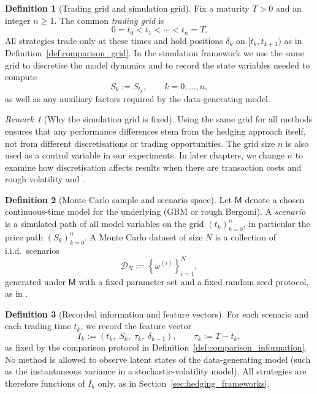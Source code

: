 \documentclass[12pt,a4paper]{article}
\theoremstyle{definition}
\newtheorem{definition}{Definition}[section]
\theoremstyle{plain}
\theoremstyle{remark}
\newtheorem{remark}{Remark}[section]
\theoremstyle{plain}
\begin{document}
\begin{definition}[Trading grid and simulation grid]
\label{def:sim_grid}
Fix a maturity $T>0$ and an integer $n\ge 1$. 
The common \emph{trading grid} is
\[
0=t_0<t_1<\cdots<t_n=T.
\]
All strategies trade only at these times and hold positions $\delta_k$ on $[t_k,t_{k+1})$ as in Definition~\ref{def:comparison_grid}. 
In the simulation framework we use the same grid to discretise the model dynamics and to record the state variables needed to compute
\[
S_k:=S_{t_k},\qquad k=0,\dots,n,
\]
as well as any auxiliary factors required by the data-generating model.
\end{definition}

\begin{remark}[Why the simulation grid is fixed]
\label{rem:fixed_grid}
Using the same grid for all methods ensures that any performance differences stem from the hedging approach itself, not from different discretisations or trading opportunities.
The grid size $n$ is also used as a control variable in our experiments. In later chapters, we change $n$ to examine how discretisation affects results when there are transaction costs and rough volatility \cite{Buehler2019DeepHedging} and \cite{Horvath2021DeepRough}.
\end{remark}

\begin{definition}[Monte Carlo sample and scenario space]
\label{def:mc_sample}
Let $\mathsf{M}$ denote a chosen continuous-time model for the underlying (GBM or rough Bergomi). 
A \emph{scenario} is a simulated path of all model variables on the grid $(t_k)_{k=0}^n$, in particular the price path $(S_k)_{k=0}^n$. 
A Monte Carlo dataset of size $N$ is a collection of i.i.d.\ scenarios
\[
\mathcal{D}_N := \left\{\omega^{(i)}\right\}_{i=1}^N,
\]
generated under $\mathsf{M}$ with a fixed parameter set and a fixed random seed protocol, as in \cite{Buehler2019DeepHedging}.
\end{definition}

\begin{definition}[Recorded information and feature vectors]
\label{def:recorded_features}
For each scenario and each trading time $t_k$, we record the feature vector
\[
I_k := (t_k,\; S_k,\; \tau_k,\; \delta_{k-1}), \qquad \tau_k := T-t_k,
\]
as fixed by the comparison protocol in Definition~\ref{def:comparison_information}. 
No method is allowed to observe latent states of the data-generating model (such as the instantaneous variance in a stochastic-volatility model). 
All strategies are therefore functions of $I_k$ only, as in Section~\ref{sec:hedging_frameworks}.
\end{definition}
\end{document}
